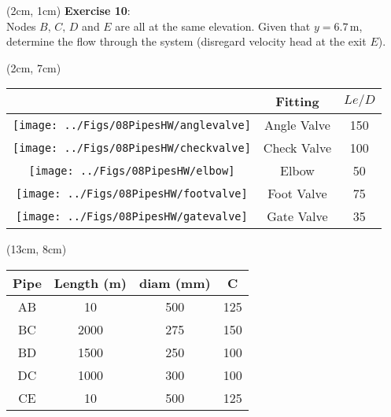 \documentclass[10pt, oneside]{amsart}
\begin{document}
 






\begin{textblock*}{1\textwidth}(2cm, 1cm)
	\textbf{Exercise 10}: \\ Nodes $B,\,C,\, D$ and $E$ are all at the same elevation. Given that $y=6.7\,\text{m}$, determine the flow through the system (disregard velocity head at the exit $E$).

	
\end{textblock*}

\begin{textblock*}{.35\textwidth}(2cm, 7cm)
	\centering
	
	\begin{tabular}{ccc}
		\toprule
		& Fitting & $Le/D$ \\
		\midrule
		\texttt{[image: ../Figs/08PipesHW/anglevalve]} & Angle Valve & 150\\
		\midrule
		\texttt{[image: ../Figs/08PipesHW/checkvalve]} & Check Valve & 100\\
		\midrule
		\texttt{[image: ../Figs/08PipesHW/elbow]} & Elbow & 50\\
		\midrule
		\texttt{[image: ../Figs/08PipesHW/footvalve]} & Foot Valve & 75\\
		\midrule
		\texttt{[image: ../Figs/08PipesHW/gatevalve]} & Gate Valve & 35\\
		\bottomrule
	\end{tabular}
\end{textblock*}


\begin{textblock*}{.35\textwidth}(13cm, 8cm)
	\centering
	
	\begin{tabular}{cccc}
		\toprule
		Pipe & Length (m) & diam (mm) & C\\
		\midrule
		AB & 10 & 500 & 125\\
		\midrule
		BC & 2000 & 275 & 150\\
		\midrule
		BD & 1500 & 250 & 100\\
		\midrule
		DC & 1000 & 300 & 100\\
		\midrule
		CE & 10 & 500 & 125\\
		\bottomrule
	\end{tabular}
\end{textblock*}
~
\vspace{11cm}
\end{document}
